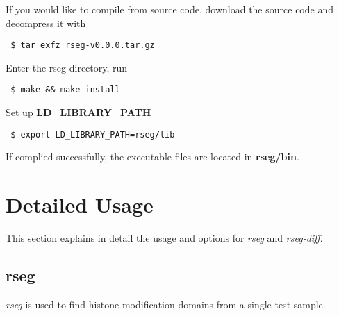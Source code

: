 \documentclass[11pt]{report}
\begin{document}
If you would like to compile from source code, download the source
code and decompress it with
\begin{verbatim}
 $ tar exfz rseg-v0.0.0.tar.gz
\end{verbatim}
%
Enter the rseg directory, run
\begin{verbatim}
 $ make && make install
\end{verbatim}
%
Set up \textbf{LD\_LIBRARY\_PATH}
\begin{verbatim}
 $ export LD_LIBRARY_PATH=rseg/lib
\end{verbatim}
If complied successfully, the executable files are located in \textbf{rseg/bin}.

\section{Detailed Usage}
\label{sec:usage-detail}

This section explains in detail the usage and options for
\textit{rseg} and \textit{rseg-diff}.

\subsection{rseg}
\label{sec:rseg-detail}

\textit{rseg} is used to find histone modification domains from a
single test sample. 
\end{document}
